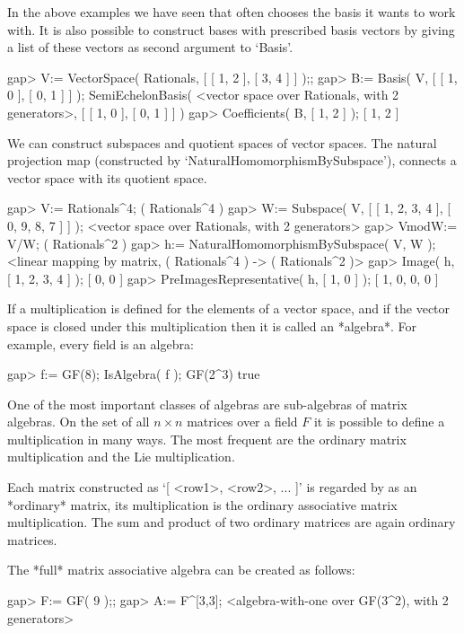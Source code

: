 In the above examples we have seen that {\GAP} often chooses the basis
it wants to work with. It is also possible to construct bases with
prescribed basis vectors by giving a list of these vectors as second argument 
to `Basis'.

\beginexample
gap> V:= VectorSpace( Rationals, [ [ 1, 2 ], [ 3, 4 ] ] );; 
gap> B:= Basis( V, [ [ 1, 0 ], [ 0, 1 ] ] );
SemiEchelonBasis( <vector space over Rationals, with 2 generators>,
[ [ 1, 0 ], [ 0, 1 ] ] )
gap> Coefficients( B, [ 1, 2 ] );
[ 1, 2 ]
\endexample

We can construct subspaces and quotient spaces of vector spaces. The
natural projection map (constructed by `NaturalHomomorphismBySubspace'),
connects a vector space with its quotient space.

\beginexample
gap> V:= Rationals^4;
( Rationals^4 )
gap> W:= Subspace( V, [ [ 1, 2, 3, 4 ], [ 0, 9, 8, 7 ] ] );
<vector space over Rationals, with 2 generators>
gap> VmodW:= V/W;
( Rationals^2 )
gap> h:= NaturalHomomorphismBySubspace( V, W );
<linear mapping by matrix, ( Rationals^4 ) -> ( Rationals^2 )>
gap> Image( h, [ 1, 2, 3, 4 ] );
[ 0, 0 ]
gap> PreImagesRepresentative( h, [ 1, 0 ] );
[ 1, 0, 0, 0 ]
\endexample



If a multiplication is defined for the elements of a vector space,
and if the vector space is closed under this multiplication then it is
called an *algebra*. For example, every field is an algebra:

\beginexample
gap> f:= GF(8); IsAlgebra( f );
GF(2^3)
true
\endexample

One of the most important classes of algebras are sub-algebras of matrix
algebras. On the set of all $n\times n$ matrices over a field $F$ 
it is possible to define a multiplication in many ways.
The most frequent are the ordinary matrix multiplication and the Lie
multiplication.

Each matrix constructed as `[ <row1>, <row2>, ... ]' is regarded by {\GAP}
as an *ordinary* matrix, its multiplication is the ordinary associative
matrix multiplication.
The sum and product of two ordinary matrices are again ordinary matrices.

The *full* matrix associative algebra can be created as follows:

\beginexample
gap> F:= GF( 9 );;
gap> A:= F^[3,3];
<algebra-with-one over GF(3^2), with 2 generators>
\endexample

